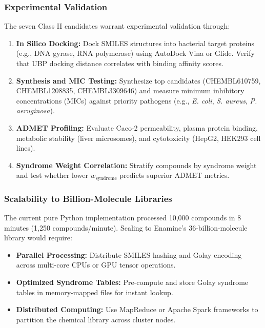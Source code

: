 \documentclass[12pt,a4paper]{article}
\begin{document}
\subsubsection{Experimental Validation}

The seven Class II candidates warrant experimental validation through:

\begin{enumerate}
\item \textbf{In Silico Docking:} Dock SMILES structures into bacterial target proteins (e.g., DNA gyrase, RNA polymerase) using AutoDock Vina or Glide. Verify that UBP docking distance correlates with binding affinity scores.

\item \textbf{Synthesis and MIC Testing:} Synthesize top candidates (CHEMBL610759, CHEMBL1208835, CHEMBL3309646) and measure minimum inhibitory concentrations (MICs) against priority pathogens (e.g., \textit{E. coli}, \textit{S. aureus}, \textit{P. aeruginosa}).

\item \textbf{ADMET Profiling:} Evaluate Caco-2 permeability, plasma protein binding, metabolic stability (liver microsomes), and cytotoxicity (HepG2, HEK293 cell lines).

\item \textbf{Syndrome Weight Correlation:} Stratify compounds by syndrome weight and test whether lower $w_{\text{syndrome}}$ predicts superior ADMET metrics.
\end{enumerate}

\subsubsection{Scalability to Billion-Molecule Libraries}

The current pure Python implementation processed 10,000 compounds in 8 minutes (1,250 compounds/minute). Scaling to Enamine's 36-billion-molecule library would require:

\begin{itemize}
\item \textbf{Parallel Processing:} Distribute SMILES hashing and Golay encoding across multi-core CPUs or GPU tensor operations.
\item \textbf{Optimized Syndrome Tables:} Pre-compute and store Golay syndrome tables in memory-mapped files for instant lookup.
\item \textbf{Distributed Computing:} Use MapReduce or Apache Spark frameworks to partition the chemical library across cluster nodes.
\end{itemize}
\end{document}
